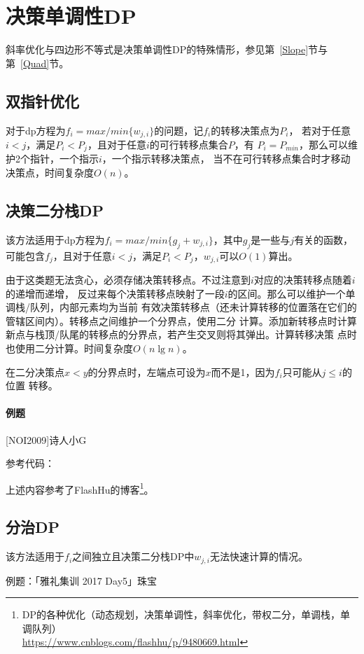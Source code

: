 \section{决策单调性DP}
斜率优化与四边形不等式是决策单调性DP的特殊情形，参见第~\ref{Slope}节与
第~\ref{Quad}节。
\subsection{双指针优化}
对于dp方程为$f_i=max/min\{w_{j,i}\}$的问题，记$f_i$的转移决策点为$P_i$，
若对于任意$i<j$，满足$P_i<P_j$，且对于任意$i$的可行转移点集合$P$，有
$P_i=P_{min}$，那么可以维护2个指针，一个指示$i$，一个指示转移决策点，
当不在可行转移点集合时才移动决策点，时间复杂度$O(n)$。
\subsection{决策二分栈DP}
该方法适用于dp方程为$f_i=max/min\{g_j+w_{j,i}\}$，其中$g_j$是一些与$j$有关的函数，
可能包含$f_j$，且对于任意$i<j$，满足$P_i<P_j$，$w_{j,i}$可以$O(1)$算出。

由于这类题无法贪心，必须存储决策转移点。不过注意到$i$对应的决策转移点随着$i$的递增而递增，
反过来每个决策转移点映射了一段$i$的区间。那么可以维护一个单调栈/队列，内部元素均为当前
有效决策转移点（还未计算转移的位置落在它们的管辖区间内）。转移点之间维护一个分界点，使用二分
计算。添加新转移点时计算新点与栈顶/队尾的转移点的分界点，若产生交叉则将其弹出。计算转移决策
点时也使用二分计算。时间复杂度$O(n\lg n)$。

在二分决策点$x<y$的分界点时，左端点可设为$x$而不是1，因为$f_i$只可能从$j\leq i$的位置
转移。

\paragraph{例题} [NOI2009]诗人小G

参考代码：


上述内容参考了FlashHu的博客\footnote{
    DP的各种优化（动态规划，决策单调性，斜率优化，带权二分，单调栈，单调队列）\\
    \url{https://www.cnblogs.com/flashhu/p/9480669.html}
}。
\subsection{分治DP}
该方法适用于$f_i$之间独立且决策二分栈DP中$w_{j,i}$无法快速计算的情况。

例题：「雅礼集训 2017 Day5」珠宝

